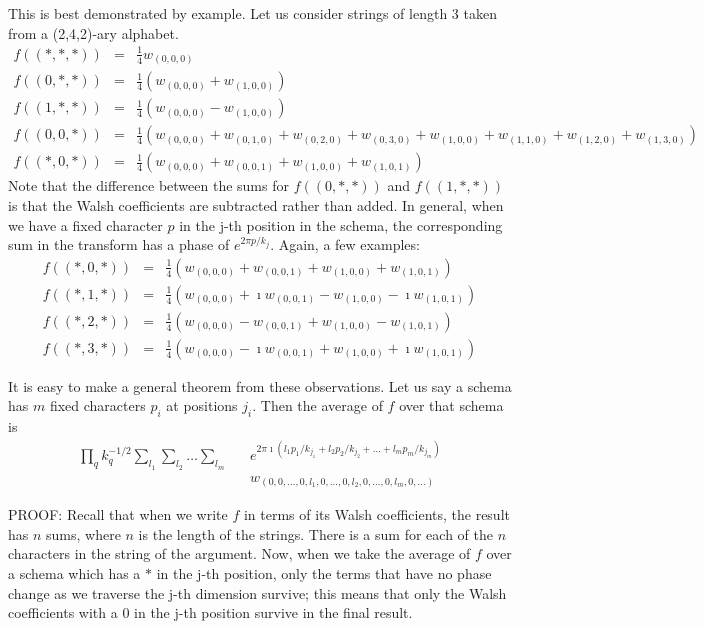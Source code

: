 This is best demonstrated by example.  Let us consider strings of length
3 taken from a (2,4,2)-ary alphabet.
\begin{eqnarray}
f((*,*,*)) &=& \frac{1}{4} w_{(0,0,0)} \nonumber \\
f((0,*,*)) &=& \frac{1}{4} (w_{(0,0,0)}+w_{(1,0,0)}) \nonumber \\
f((1,*,*)) &=& \frac{1}{4} (w_{(0,0,0)}-w_{(1,0,0)}) \nonumber \\
f((0,0,*)) &=& \frac{1}{4} (w_{(0,0,0)}+
				w_{(0,1,0)}+
				w_{(0,2,0)}+
				w_{(0,3,0)}+
				w_{(1,0,0)}+
				w_{(1,1,0)}+
				w_{(1,2,0)}+
				w_{(1,3,0)}) \nonumber \\
f((*,0,*)) &=& \frac{1}{4} (w_{(0,0,0)}+
				w_{(0,0,1)}+
				w_{(1,0,0)}+
				w_{(1,0,1)})
\end{eqnarray}
Note that the difference between the sums for $f((0,*,*))$ and $f((1,*,*))$
is that the Walsh coefficients are subtracted rather than added.  In
general, when we have a fixed character $p$ in the j-th position in the schema,
the corresponding sum in the transform has a phase of $e^{2 \pi p/k_j}$.
Again, a few examples:
\begin{eqnarray}
f((*,0,*)) &=& \frac{1}{4} (w_{(0,0,0)}+
				w_{(0,0,1)}+
				w_{(1,0,0)}+
				w_{(1,0,1)}) \nonumber \\
f((*,1,*)) &=& \frac{1}{4} (w_{(0,0,0)}+ \imath
				w_{(0,0,1)}-
				w_{(1,0,0)} - \imath
				w_{(1,0,1)}) \nonumber \\
f((*,2,*)) &=& \frac{1}{4} (w_{(0,0,0)}-
				w_{(0,0,1)}+
				w_{(1,0,0)} -
				w_{(1,0,1)}) \nonumber \\
f((*,3,*)) &=& \frac{1}{4} (w_{(0,0,0)}-\imath
				w_{(0,0,1)}+
				w_{(1,0,0)} +\imath
				w_{(1,0,1)}) 
\end{eqnarray}

It is easy to make a general theorem from these observations.
Let us say a schema has $m$ fixed characters $p_i$ at positions $j_i$.
Then the average of $f$ over that schema is
\begin{eqnarray}
\prod_q{k_q^{-1/2}}
\sum_{l_1} \sum_{l_2} \ldots \sum_{l_m} & &
e^{2 \pi \imath (l_1 p_1/k_{j_1}+l_2 p_2/k_{j_2} 
	+\ldots+l_m p_m/k_{j_m})}\nonumber\\
&& w_{(0,0,\ldots,0,l_1,0,\ldots,0,l_2,0,\ldots,0,l_m,0,\ldots)}
\end{eqnarray}

PROOF:
Recall that when we write $f$ in terms of its Walsh coefficients, the
result has $n$ sums, where $n$ is the length of the strings.  There is
a sum for each of the $n$ characters in the string of the argument.  Now,
when we take the average of $f$ over a schema which has a $*$ in the j-th
position, only the terms that have no phase change as we traverse the j-th
dimension survive; this means that only the Walsh coefficients with a $0$
in the j-th position survive in the final result.


